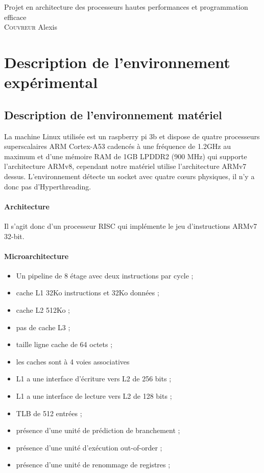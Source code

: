 \documentclass[11pt,a4paper]{article}
\begin{document}
\pagestyle{empty}

\begin{center}
{\LARGE Projet en architecture des processeurs hautes
performances et programmation efficace} \\[.8cm]
{\large \textsc{Couvreur} Alexis \quad} \\[2cm]
\end{center}

\tableofcontents


\clearpage

\section{Description de l'environnement expérimental}

\pagestyle{fancy}

\subsection{Description de l'environnement matériel}
La machine Linux utilisée est un raspberry pi 3b et dispose de quatre processeurs superscalaires ARM Cortex-A53 cadencés à une fréquence de 1.2GHz au maximum et d'une mémoire RAM de 1GB LPDDR2 (900 MHz) qui supporte l'architecture ARMv8, cependant notre matériel utilise l'architecture ARMv7 dessus.
L'environnement détecte un socket avec quatre cœurs physiques, il n'y a donc pas d'Hyperthreading.
\paragraph*{Architecture}
Il s'agit donc d'un processeur RISC qui implémente le jeu d'instructions ARMv7 32-bit.

\paragraph*{Microarchitecture} 
\begin{itemize}
\item Un pipeline de 8 étage avec deux instructions par cycle ;
\item cache L1 32Ko instructions et 32Ko données ;
\item cache L2 512Ko ;
\item pas de cache L3 ;
\item taille ligne cache de 64 octets ;
\item les caches sont à 4 voies associatives
\item L1 a une interface d'écriture vers L2 de 256 bits ;
\item L1 a une interface de lecture vers L2 de 128 bits ;
\item TLB de 512 entrées ;
\item présence d'une unité de prédiction de branchement ;
\item présence d'une unité d'exécution out-of-order ;
\item présence d'une unité de renommage de registres ;
\end{itemize}
\end{document}
